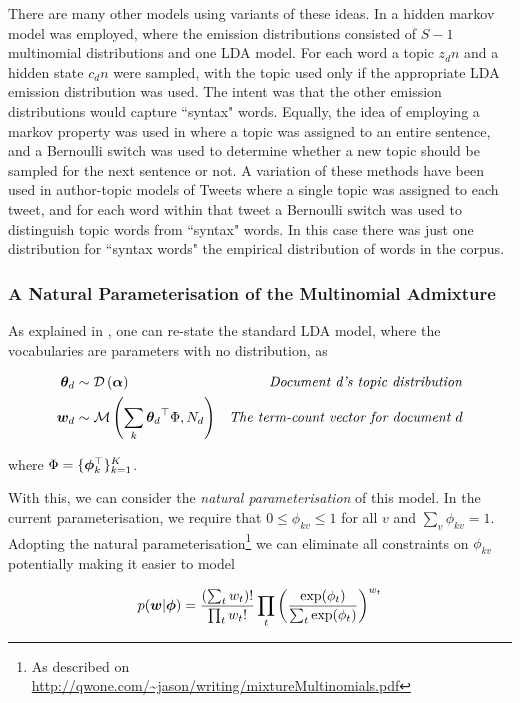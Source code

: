 There are many other models using variants of these ideas. In \cite{Griffiths2005} a hidden markov model was employed, where the emission distributions consisted of $S-1$ multinomial distributions and one LDA model. For each word a topic $z_dn$ and a hidden state $c_dn$ were sampled, with the topic used only if the appropriate LDA emission distribution was used. The intent was that the other emission distributions would capture ``syntax" words. Equally, the idea of employing a markov property was used in \cite{Gruber2007} where a topic was assigned to an entire sentence, and a Bernoulli switch was used to determine whether a new topic should be sampled for the next sentence or not. A variation of these methods have been used in author-topic models\cite{RosenZvi2004} of Tweets\cite{Zhao2011}\cite{Zhao2011a} where a single topic was assigned to each tweet, and for each word within that tweet a Bernoulli switch was used to distinguish topic words from ``syntax" words. In this case there was just one distribution for ``syntax words" the empirical distribution of words in the corpus.




\subsubsection{A Natural Parameterisation of the Multinomial Admixture}
As explained in \cite{Buntine2002}, one can re-state the standard LDA model, where the vocabularies are parameters with no distribution, as

\begin{align}
{  \bm \theta _d } & \sim \mathcal{D} \left( {\bm \alpha} \right) & \text{\emph{Document d's topic distribution}} \\
\bm w_d & \sim \mathcal{M} \left( {\sum_k { \bm \theta_d }^\top\Phi},{N_d} \right) & \text{\emph{The term-count vector for document $d$}} \label{eqn:lda_convex_combo}
\end{align}

where $\Phi = \{\bm \phi_k^\top\}_{k=1}^{K}$.

With this, we can consider the \emph{natural parameterisation} of this model. In the current parameterisation, we require that $0 \leq \phi_{kv} \leq 1$ for all $v$ and $\sum_v \phi_{kv} = 1$. Adopting the natural parameterisation\footnote{As described on \url{http://qwone.com/~jason/writing/mixtureMultinomials.pdf}} we can eliminate all constraints on $\phi_{kv}$ potentially making it easier to model

\begin{align}
p(\bm w|\bm \phi) = \frac{(\sum_t w_t)!}{\prod_t w_t !} 
\prod_t \left(   
    \frac{\exp(\phi_t)}{\sum_t \exp(\phi_t)}
\right)^{w_t}
\end{align}

